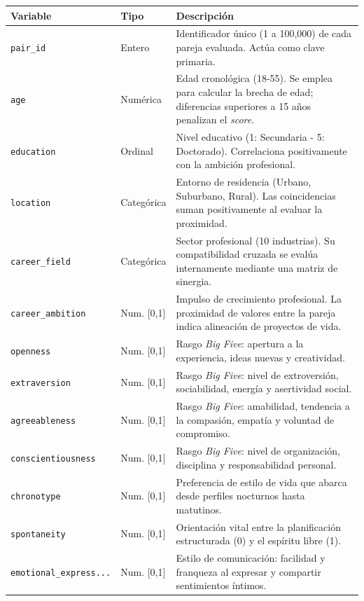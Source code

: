 \begin{table}[H]
\centering
\footnotesize %
\begin{tabular}{llp{10.5cm}}
\hline
\textbf{Variable} & \textbf{Tipo} & \textbf{Descripción} \\ \hline
\texttt{pair\_id} & Entero & Identificador único (1 a 100,000) de cada pareja evaluada. Actúa como clave primaria. \\
\texttt{age} & Numérica & Edad cronológica (18-55). Se emplea para calcular la brecha de edad; diferencias superiores a 15 años penalizan el \textit{score}. \\
\texttt{education} & Ordinal & Nivel educativo (1: Secundaria - 5: Doctorado). Correlaciona positivamente con la ambición profesional. \\
\texttt{location} & Categórica & Entorno de residencia (Urbano, Suburbano, Rural). Las coincidencias suman positivamente al evaluar la proximidad. \\
\texttt{career\_field} & Categórica & Sector profesional (10 industrias). Su compatibilidad cruzada se evalúa internamente mediante una matriz de sinergia. \\
\texttt{career\_ambition} & Num. [0,1] & Impulso de crecimiento profesional. La proximidad de valores entre la pareja indica alineación de proyectos de vida. \\
\texttt{openness} & Num. [0,1] & Rasgo \textit{Big Five}: apertura a la experiencia, ideas nuevas y creatividad. \\
\texttt{extraversion} & Num. [0,1] & Rasgo \textit{Big Five}: nivel de extroversión, sociabilidad, energía y asertividad social. \\
\texttt{agreeableness} & Num. [0,1] & Rasgo \textit{Big Five}: amabilidad, tendencia a la compasión, empatía y voluntad de compromiso. \\
\texttt{conscientiousness} & Num. [0,1] & Rasgo \textit{Big Five}: nivel de organización, disciplina y responsabilidad personal. \\
\texttt{chronotype} & Num. [0,1] & Preferencia de estilo de vida que abarca desde perfiles nocturnos hasta matutinos. \\
\texttt{spontaneity} & Num. [0,1] & Orientación vital entre la planificación estructurada (0) y el espíritu libre (1). \\
\texttt{emotional\_express...} & Num. [0,1] & Estilo de comunicación: facilidad y franqueza al expresar y compartir sentimientos íntimos. \\

\end{tabular}
\end{table}
